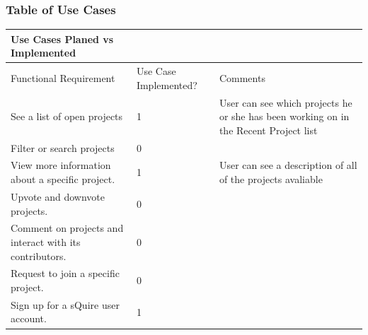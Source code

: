 \documentclass[twoside,letterpaper]{article}
\begin{document}
\subsubsection{Table of Use Cases}
\begin{tabular}{|p{6cm}|p{2.5cm}|p{8cm}|}
\hline
Use Cases Planed vs Implemented                                                        &                       &                                                                                                                          \\ \hline
Functional Requirement                                                                 & Use Case Implemented? & Comments                                                                                                                 \\ \hline
See a list of open projects                                                            & 1                     & User can see which projects he or she has been working on in the Recent Project list                                     \\ \hline
Filter or search projects                                                              & 0                     &                                                                                                                          \\ \hline
View more information about a specific project.                                        & 1                     & User can see a description of all of the projects avaliable                                                              \\ \hline
Upvote and downvote projects.                                                          & 0                     &                                                                                                                          \\ \hline
Comment on projects and interact with its contributors.                                & 0                     &                                                                                                                          \\ \hline
Request to join a specific project.                                                    & 0                     &                                                                                                                          \\ \hline
Sign up for a sQuire user account.                                                     & 1                     &                                                                                                                          \\ \hline

\end{tabular}
\end{document}
